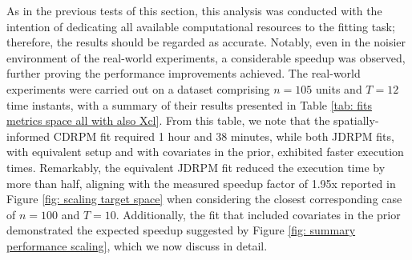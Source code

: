 \documentclass[12pt,	%
	a4paper,		%
	twoside,		%
	openright,		%
	titlepage,%
	]{book}
\theoremstyle{definition}
\begin{document}
As in the previous tests of this section, this analysis was conducted with the intention of dedicating all available computational resources to the fitting task; therefore, the results should be regarded as accurate. Notably, even in the noisier environment of the real-world experiments, a considerable speedup was observed, further proving the performance improvements achieved. The real-world experiments were carried out on a dataset comprising $n=105$ units and $T=12$ time instants, with a summary of their results presented in Table \ref{tab: fits metrics space all with also Xcl}. From this table, we note that the spatially-informed CDRPM fit required 1 hour and 38 minutes, while both JDRPM fits, with equivalent setup and with covariates in the prior, exhibited faster execution times. Remarkably, the equivalent JDRPM fit reduced the execution time by more than half, aligning with the measured speedup factor of 1.95x reported in Figure \ref{fig: scaling target space} when considering the closest corresponding case of $n=100$ and $T=10$. Additionally, the fit that included covariates in the prior demonstrated the expected speedup suggested by Figure \ref{fig: summary performance scaling}, which we now discuss in detail.

\end{document}

